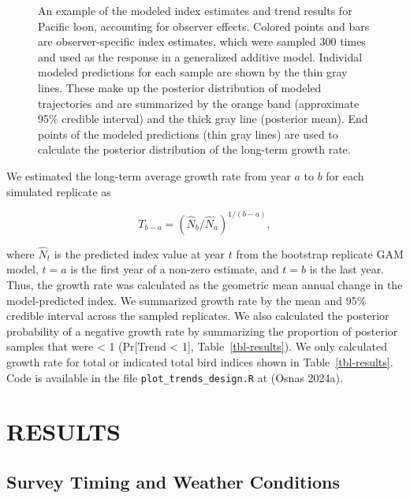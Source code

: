\documentclass[
]{article}
\begin{document}
\begin{figure}


\caption{\label{fig-loon}An example of the modeled index estimates and
trend results for Pacific loon, accounting for observer effects. Colored
points and bars are observer-specific index estimates, which were
sampled 300 times and used as the response in a generalized additive
model. Individal modeled predictions for each sample are shown by the
thin gray lines. These make up the posterior distribution of modeled
trajectories and are summarized by the orange band (approximate 95\%
credible interval) and the thick gray line (posterior mean). End points
of the modeled predictions (thin gray lines) are used to calculate the
posterior distribution of the long-term growth rate.}

\end{figure}%

We estimated the long-term average growth rate from year \(a\) to \(b\)
for each simulated replicate as

\[T_{b-a} = (\hat N_{b}/\hat N_{a})^{1/(b-a)},\]

where \(\hat N_t\) is the predicted index value at year \(t\) from the
bootstrap replicate GAM model, \(t = a\) is the first year of a non-zero
estimate, and \(t = b\) is the last year. Thus, the growth rate was
calculated as the geometric mean annual change in the model-predicted
index. We summarized growth rate by the mean and 95\% credible interval
across the sampled replicates. We also calculated the posterior
probability of a negative growth rate by summarizing the proportion of
posterior samples that were \textless{} 1 (Pr{[}Trend \textless{} 1{]},
Table~\ref{tbl-results}). We only calculated growth rate for total or
indicated total bird indices shown in Table~\ref{tbl-results}. Code is
available in the file \texttt{plot\_trends\_design.R} at (Osnas 2024a).

\section*{RESULTS}\label{results}

\subsection*{Survey Timing and Weather
Conditions}\label{survey-timing-and-weather-conditions-1}
\end{document}
